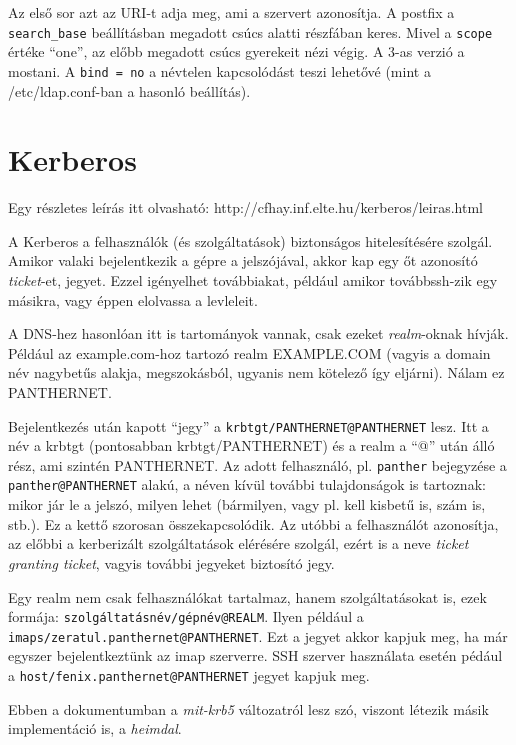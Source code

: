 \documentclass[fleqn,10pt,a4paper,titlepage]{article}
\begin{document}
  Az első sor azt az URI-t adja meg, ami a szervert azonosítja. A postfix a \texttt{search\_base} beállításban megadott
  csúcs alatti részfában keres. Mivel a \texttt{scope} értéke ``one'', az előbb megadott csúcs gyerekeit nézi végig. A
  3-as verzió  a mostani. A \texttt{bind = no} a névtelen kapcsolódást teszi lehetővé (mint a /etc/ldap.conf-ban a
  hasonló beállítás).

  \newpage
  \section{Kerberos}

  Egy részletes leírás itt olvasható: http://cfhay.inf.elte.hu/kerberos/leiras.html

  A Kerberos a felhasználók (és szolgáltatások) biztonságos hitelesítésére szolgál. Amikor valaki bejelentkezik a gépre
  a jelszójával, akkor kap egy őt azonosító \emph{ticket}-et, jegyet. Ezzel igényelhet továbbiakat, például amikor
  továbbssh-zik egy másikra, vagy éppen elolvassa a levleleit.
  
  A DNS-hez hasonlóan itt is tartományok vannak, csak ezeket \emph{realm}-oknak hívják. Például az example.com-hoz
  tartozó realm EXAMPLE.COM (vagyis a domain név nagybetűs alakja, megszokásból, ugyanis nem kötelező így
  eljárni). Nálam ez PANTHERNET.

  Bejelentkezés után kapott ``jegy'' a \texttt{krbtgt/PANTHERNET@PANTHERNET} lesz. Itt a név a krbtgt (pontosabban
  krbtgt/PANTHERNET) és a realm a ``@'' után álló rész, ami szintén PANTHERNET. Az adott felhasználó,
  pl. \texttt{panther} bejegyzése a \texttt{panther@PANTHERNET} alakú, a néven kívül további tulajdonságok is tartoznak:
  mikor jár le a jelszó, milyen lehet (bármilyen, vagy pl. kell kisbetű is, szám is, stb.). Ez a kettő szorosan
  összekapcsolódik. Az utóbbi a felhasználót azonosítja, az előbbi a kerberizált szolgáltatások elérésére szolgál, ezért
  is a neve \emph{ticket granting ticket}, vagyis további jegyeket biztosító jegy.
  
  Egy realm nem csak felhasználókat tartalmaz, hanem szolgáltatásokat is, ezek formája:
  \texttt{szolgáltatásnév/gépnév@REALM}. Ilyen például a \texttt{imaps/zeratul.panthernet@PANTHERNET}. Ezt a jegyet
  akkor kapjuk meg, ha már egyszer bejelentkeztünk az imap szerverre. SSH szerver használata esetén pédául a
  \texttt{host/fenix.panthernet@PANTHERNET} jegyet kapjuk meg.

  Ebben a dokumentumban a \emph{mit-krb5} változatról lesz szó, viszont létezik másik implementáció is, a \emph{heimdal}.
\end{document}
